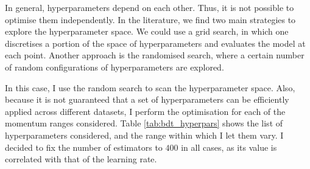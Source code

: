 In general, hyperparameters depend on each other. Thus, it is not possible to optimise them independently. In the literature, we find two main strategies to explore the hyperparameter space. We could use a grid search, in which one discretises a portion of the space of hyperparameters and evaluates the model at each point. Another approach is the randomised search, where a certain number of random configurations of hyperparameters are explored.

In this case, I use the random search to scan the hyperparameter space. Also, because it is not guaranteed that a set of hyperparameters can be efficiently applied across different datasets, I perform the optimisation for each of the momentum ranges considered. Table \ref{tab:bdt_hyperpars} shows the list of hyperparameters considered, and the range within which I let them vary. I decided to fix the number of estimators to $400$ in all cases, as its value is correlated with that of the learning rate.

